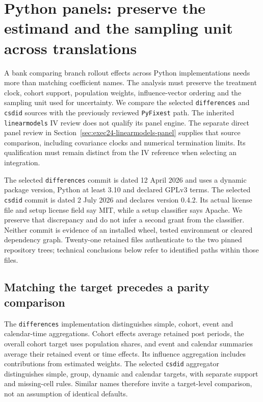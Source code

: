 \section{Python panels: preserve the estimand and the sampling unit across translations}
\label{sec:exec24-panels-python}

A bank comparing branch rollout effects across Python implementations needs
more than matching coefficient names. The analysis must preserve the treatment
clock, cohort support, population weights, influence-vector ordering and the
sampling unit used for uncertainty. We compare the selected \texttt{differences}
and \texttt{csdid} sources with the previously reviewed \texttt{PyFixest}
path. The inherited \texttt{linearmodels} IV review does not qualify its panel
engine. The separate direct panel review in
Section~\ref{sec:exec24-linearmodels-panel} supplies that source comparison,
including covariance clocks and numerical termination limits. Its qualification
must remain distinct from the IV reference when selecting an integration.
\citep{exec24_panelpy_contract,exec23_pyfixest_reuse_source,exec22_linearmodels_reuse}

The selected \texttt{differences} commit is dated 12 April 2026 and uses a
dynamic package version, Python at least 3.10 and declared GPLv3 terms.
The selected \texttt{csdid} commit is dated 2 July 2026 and declares version
0.4.2. Its actual license file and setup license field say MIT, while a setup
classifier says Apache. We preserve that discrepancy and do not infer a
second grant from the classifier. Neither commit is evidence of an installed
wheel, tested environment or cleared dependency graph. Twenty-one retained
files authenticate to the two pinned repository trees; technical conclusions
below refer to identified paths within those files.
\citep{exec24_panelpy_differences,exec24_panelpy_csdid}

\subsection{Matching the target precedes a parity comparison}
The \texttt{differences} implementation distinguishes simple, cohort,
event and calendar-time aggregations. Cohort effects average retained post
periods, the overall cohort target uses population shares, and event and
calendar summaries average their retained event or time effects. Its influence
aggregation includes contributions from estimated weights. The selected
\texttt{csdid} aggregator distinguishes simple, group, dynamic and calendar
targets, with separate support and missing-cell rules. Similar names therefore
invite a target-level comparison, not an assumption of identical defaults.
\citep{exec24_panelpy_differences,exec24_panelpy_csdid}

